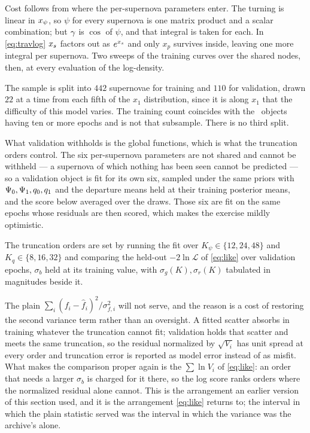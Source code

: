 \documentclass[11pt]{article}
\theoremstyle{plain}
\begin{document}
Cost follows from where the per-supernova parameters enter. The turning is linear in
$x_{\psi}$, so $\psi$ for every supernova is one matrix product and a scalar
combination; but $\gamma$ is $\cos$ of $\psi$, and that integral is taken for each. In
\eqref{eq:travlog} $x_{s}$ factors out as $e^{x_{s}}$ and only $x_p$ survives inside,
leaving one more integral per supernova. Two sweeps of the training curves over the shared
nodes, then, at every evaluation of the log-density.

The sample is split into $442$ supernovae for training and $110$ for validation, drawn
$22$ at a time from each fifth of the $x_{1}$ distribution, since it is along $x_{1}$ that
the difficulty of this model varies. The training count coincides with the \Nten\ objects
having ten or more epochs and is not that subsample. There is no third split.

What validation withholds is the global functions, which is what the truncation orders
control. The six per-supernova parameters are not shared and cannot be withheld --- a
supernova of which nothing has been seen cannot be predicted --- so a validation object is
fit for its own six, sampled under the same priors with
$\Psi_{0}, \Psi_{1}, q_{0}, q_{1}$ and the departure means held
at their training posterior means, and the score below averaged over the draws. Those six
are fit on the same epochs whose residuals are then
scored, which makes the exercise mildly optimistic.

The truncation orders are set by running the fit over
$K_{\psi} \in \{12, 24, 48\}$ and $K_{q} \in \{8, 16, 32\}$ and comparing the held-out
$-2\ln\mathcal{L}$ of \eqref{eq:like} over validation epochs, $\sigma_{b}$ held at its
training value, with $\sigma_{g}(K), \sigma_{r}(K)$ tabulated in magnitudes beside it.

The plain $\sum_{i}(f_{i} - \hat f_{i})^{2}/\sigma_{f,i}^{2}$ will not serve, and the
reason is a cost of restoring the second variance term rather than an oversight. A fitted
scatter absorbs in training whatever the truncation cannot fit; validation holds that
scatter and meets the same truncation, so the residual normalized by $\sqrt{V_{i}}$ has
unit spread at every order and truncation error is reported as model error instead of as
misfit. What makes the comparison proper again is the $\sum\ln V_{i}$ of
\eqref{eq:like}: an order that needs a larger $\sigma_{b}$ is charged for it there, so the
log score ranks orders where the normalized residual alone cannot. This is the arrangement
an earlier version of this section used, and it is the arrangement \eqref{eq:like} returns
to; the interval in which the plain statistic served was the interval in which the variance
was the archive's alone.
\end{document}
